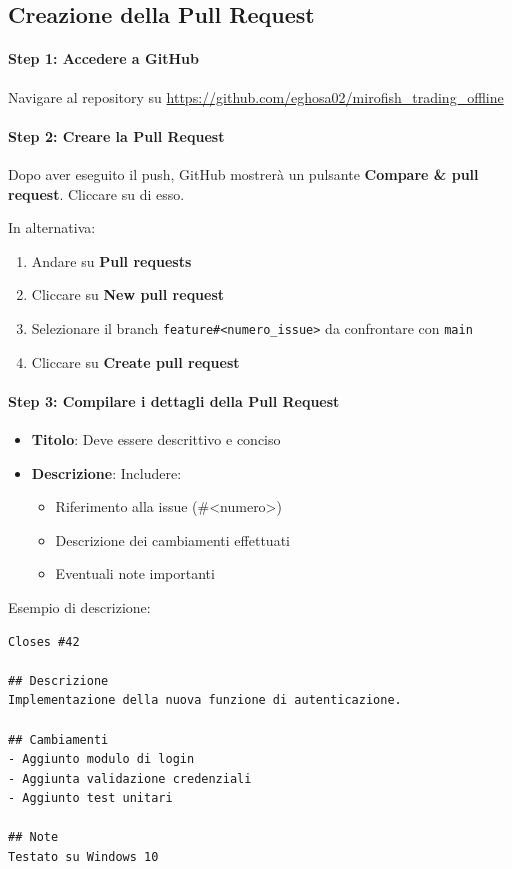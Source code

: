 \subsection{Creazione della Pull Request}

\paragraph{Step 1: Accedere a GitHub}
Navigare al repository su \url{https://github.com/eghosa02/mirofish_trading_offline}

\paragraph{Step 2: Creare la Pull Request}
Dopo aver eseguito il push, GitHub mostrerà un pulsante \textbf{Compare \& pull request}. Cliccare su di esso.

In alternativa:
\begin{enumerate}
  \item Andare su \textbf{Pull requests}
  \item Cliccare su \textbf{New pull request}
  \item Selezionare il branch \texttt{feature\#<numero\_issue>} da confrontare con \texttt{main}
  \item Cliccare su \textbf{Create pull request}
\end{enumerate}

\paragraph{Step 3: Compilare i dettagli della Pull Request}
\begin{itemize}
  \item \textbf{Titolo}: Deve essere descrittivo e conciso
  \item \textbf{Descrizione}: Includere:
  \begin{itemize}
    \item Riferimento alla issue (\#<numero>)
    \item Descrizione dei cambiamenti effettuati
    \item Eventuali note importanti
  \end{itemize}
\end{itemize}

Esempio di descrizione:
\begin{verbatim}
Closes #42

## Descrizione
Implementazione della nuova funzione di autenticazione.

## Cambiamenti
- Aggiunto modulo di login
- Aggiunta validazione credenziali
- Aggiunto test unitari

## Note
Testato su Windows 10
\end{verbatim}

